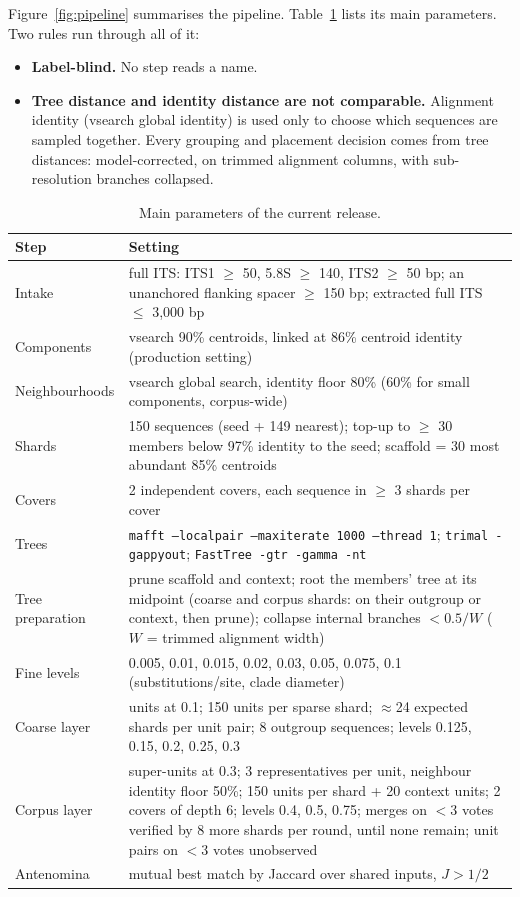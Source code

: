 \documentclass[11pt,a4paper]{article}
\begin{document}
Figure~\ref{fig:pipeline} summarises the pipeline. Table~\ref{tab:params} lists its main
parameters. Two rules run through all of it:
\begin{itemize}
  \item \textbf{Label-blind.} No step reads a name.
  \item \textbf{Tree distance and identity distance are not comparable.} Alignment identity
        (vsearch global identity) is used only to choose which sequences are sampled together.
        Every grouping and placement decision comes from tree distances: model-corrected, on
        trimmed alignment columns, with sub-resolution branches collapsed.
\end{itemize}

\begin{table}[t]
\centering\small
\caption{Main parameters of the current release.}
\label{tab:params}
\begin{tabularx}{\linewidth}{@{}lX@{}}
\toprule
Step & Setting \\
\midrule
Intake & full ITS: ITS1 $\ge$ 50, 5.8S $\ge$ 140, ITS2 $\ge$ 50 bp; an unanchored flanking spacer
         $\ge$ 150 bp; extracted full ITS $\le$ 3{,}000 bp \\
Components & vsearch 90\% centroids, linked at 86\% centroid identity (production setting) \\
Neighbourhoods & vsearch global search, identity floor 80\% (60\% for small components, corpus-wide) \\
Shards & 150 sequences (seed + 149 nearest); top-up to $\ge$ 30 members below 97\% identity to the
         seed; scaffold = 30 most abundant 85\% centroids \\
Covers & 2 independent covers, each sequence in $\ge$ 3 shards per cover \\
Trees & \texttt{mafft --localpair --maxiterate 1000 --thread 1}; \texttt{trimal -gappyout};
        \texttt{FastTree -gtr -gamma -nt} \\
Tree preparation & prune scaffold and context; root the members' tree at its midpoint (coarse and
        corpus shards: on their outgroup or context, then prune); collapse internal branches
        $< 0.5/W$ ($W$ = trimmed alignment width) \\
Fine levels & 0.005, 0.01, 0.015, 0.02, 0.03, 0.05, 0.075, 0.1 (substitutions/site, clade diameter) \\
Coarse layer & units at 0.1; 150 units per sparse shard; $\approx$24 expected shards per unit pair;
        8 outgroup sequences; levels 0.125, 0.15, 0.2, 0.25, 0.3 \\
Corpus layer & super-units at 0.3; 3 representatives per unit, neighbour identity floor 50\%;
        150 units per shard + 20 context units; 2 covers of depth 6; levels 0.4, 0.5, 0.75;
        merges on $<3$ votes verified by 8 more shards per round, until none remain; unit pairs on
        $<3$ votes unobserved \\
Antenomina & mutual best match by Jaccard over shared inputs, $J > 1/2$ \\
\bottomrule
\end{tabularx}
\end{table}
\end{document}

